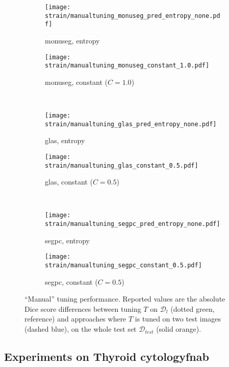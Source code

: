 \begin{figure}
  \centering
  \begin{subfigure}{0.48\textwidth}
    \centering
    \texttt{[image: strain/manualtuning\_monuseg\_pred\_entropy\_none.pdf]}
    \caption{\acrshort{monuseg}, entropy}
    \label{sfig:strain:manual:monu_entropy}
  \end{subfigure}
  \begin{subfigure}{0.48\textwidth}
    \centering
    \texttt{[image: strain/manualtuning\_monuseg\_constant\_1.0.pdf]}
    \caption{\acrshort{monuseg}, constant ($C=1.0$)}
    \label{sfig:strain:manual:monu_constant}
  \end{subfigure} \\
  \begin{subfigure}{0.48\textwidth}
    \centering
    \texttt{[image: strain/manualtuning\_glas\_pred\_entropy\_none.pdf]}
    \caption{\acrshort{glas}, entropy}
    \label{sfig:strain:manual:_glas_pred_entropy_none}
  \end{subfigure}
  \begin{subfigure}{0.48\textwidth}
    \centering
    \texttt{[image: strain/manualtuning\_glas\_constant\_0.5.pdf]}
    \caption{\acrshort{glas}, constant ($C=0.5$)}
    \label{sfig:strain:manual:_glas_constant}
  \end{subfigure} \\
  \begin{subfigure}{0.48\textwidth}
    \centering
    \texttt{[image: strain/manualtuning\_segpc\_pred\_entropy\_none.pdf]}
    \caption{\acrshort{segpc}, entropy}
    \label{sfig:strain:manual:_segpc_pred_entropy_none}
  \end{subfigure}
  \begin{subfigure}{0.48\textwidth}
    \centering
    \texttt{[image: strain/manualtuning\_segpc\_constant\_0.5.pdf]}
    \caption{\acrshort{segpc}, constant ($C=0.5$)}
    \label{sfig:strain:manual:_segpc_constant}
  \end{subfigure}
  \caption{``Manual'' tuning performance. Reported values are the absolute Dice score differences between tuning $T$ on $\mathcal{D}_l$ (dotted green, reference) and approaches where $T$ is tuned on two test images (dashed blue), on the whole test set $\mathcal{D}_{test}$ (solid orange).}
  \label{fig:strain:manualtuning}

\end{figure}


\subsection{Experiments on Thyroid cytology\acrshort{fnab}}
\label{ssec:strain:thyroid_exp}

